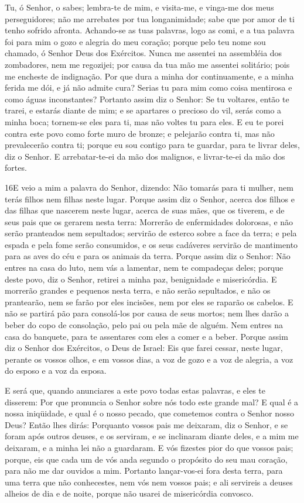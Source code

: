 Tu, ó Senhor, o sabes; lembra-te de mim, e visita-me, e vinga-me
dos meus perseguidores; não me arrebates por tua longanimidade; sabe
que por amor de ti tenho sofrido afronta. Achando-se as tuas
palavras, logo as comi, e a tua palavra foi para mim o gozo e
alegria do meu coração; porque pelo teu nome sou chamado, ó Senhor
Deus dos Exércitos. Nunca me assentei na assembléia dos
zombadores, nem me regozijei; por causa da tua mão me assentei
solitário; pois me encheste de indignação. Por que dura a
minha dor continuamente, e a minha ferida me dói, e já não admite
cura? Serias tu para mim como coisa mentirosa e como águas
inconstantes? Portanto assim diz o Senhor: Se tu voltares,
então te trarei, e estarás diante de mim; e se apartares o precioso
do vil, serás como a minha boca; tornem-se eles para ti, mas não
voltes tu para eles. E eu te porei contra este povo como
forte muro de bronze; e pelejarão contra ti, mas não prevalecerão
contra ti; porque eu sou contigo para te guardar, para te livrar
deles, diz o Senhor. E arrebatar-te-ei da mão dos malignos, e
livrar-te-ei da mão dos fortes.

\medskip

\lettrine{16} E veio a mim a palavra do Senhor, dizendo:
Não tomarás para ti mulher, nem terás filhos nem filhas neste
lugar. Porque assim diz o Senhor, acerca dos filhos e das filhas
que nascerem neste lugar, acerca de suas mães, que os tiverem, e de
seus pais que os gerarem nesta terra: Morrerão de enfermidades
dolorosas, e não serão pranteados nem sepultados; servirão de
esterco sobre a face da terra; e pela espada e pela fome serão
consumidos, e os seus cadáveres servirão de mantimento para as aves
do céu e para os animais da terra. Porque assim diz o Senhor:
Não entres na casa do luto, nem vás a lamentar, nem te compadeças
deles; porque deste povo, diz o Senhor, retirei a minha paz,
benignidade e misericórdia. E morrerão grandes e pequenos nesta
terra, e não serão sepultados, e não os prantearão, nem se farão por
eles incisões, nem por eles se raparão os cabelos. E não se
partirá pão para consolá-los por causa de seus mortos; nem lhes
darão a beber do copo de consolação, pelo pai ou pela mãe de alguém.
Nem entres na casa do banquete, para te assentares com eles a
comer e a beber. Porque assim diz o Senhor dos Exércitos, o Deus
de Israel: Eis que farei cessar, neste lugar, perante os vossos
olhos, e em vossos dias, a voz de gozo e a voz de alegria, a voz do
esposo e a voz da esposa.

E será que, quando anunciares a este povo todas estas palavras, e
eles te disserem: Por que pronuncia o Senhor sobre nós todo este
grande mal? E qual é a nossa iniqüidade, e qual é o nosso pecado,
que cometemos contra o Senhor nosso Deus? Então lhes dirás:
Porquanto vossos pais me deixaram, diz o Senhor, e se foram após
outros deuses, e os serviram, e se inclinaram diante deles, e a mim
me deixaram, e a minha lei não a guardaram. E vós fizestes
pior do que vossos pais; porque, eis que cada um de vós anda segundo
o propósito do seu mau coração, para não me dar ouvidos a mim.
Portanto lançar-vos-ei fora desta terra, para uma terra que
não conhecestes, nem vós nem vossos pais; e ali servireis a deuses
alheios de dia e de noite, porque não usarei de misericórdia
convosco.

